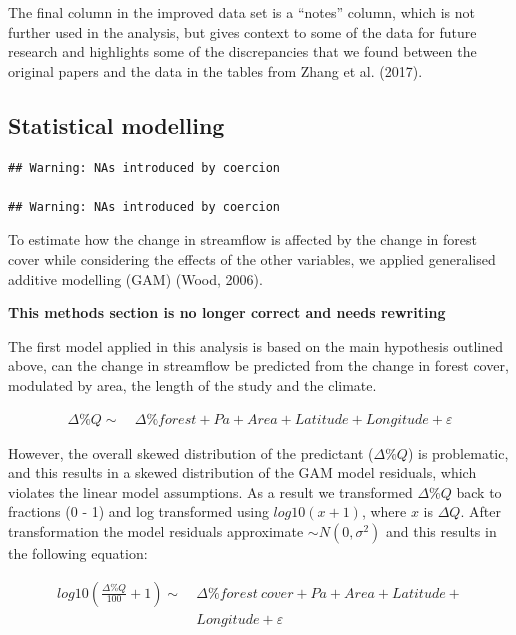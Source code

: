 \documentclass[]{elsarticle} %
\begin{document}
The final column in the improved data set is a ``notes'' column, which
is not further used in the analysis, but gives context to some of the
data for future research and highlights some of the discrepancies that
we found between the original papers and the data in the tables from
Zhang et al. (2017).

\hypertarget{statistical-modelling}{%
\subsection{Statistical modelling}\label{statistical-modelling}}

\begin{verbatim}
## Warning: NAs introduced by coercion

## Warning: NAs introduced by coercion
\end{verbatim}

To estimate how the change in streamflow is affected by the change in
forest cover while considering the effects of the other variables, we
applied generalised additive modelling (GAM) (Wood, 2006).

\textbf{This methods section is no longer correct and needs rewriting}

The first model applied in this analysis is based on the main hypothesis
outlined above, can the change in streamflow be predicted from the
change in forest cover, modulated by area, the length of the study and
the climate.

\[\tag{1}
\begin{aligned}
\Delta \%Q \sim ~&\Delta \%forest + Pa + Area + Latitude + Longitude + \varepsilon
\end{aligned}\]

However, the overall skewed distribution of the predictant
(\(\Delta \%Q\)) is problematic, and this results in a skewed
distribution of the GAM model residuals, which violates the linear model
assumptions. As a result we transformed \(\Delta \%Q\) back to fractions
(0 - 1) and log transformed using \(log10(x + 1)\), where \(x\) is
\(\Delta Q\). After transformation the model residuals approximate
\(\sim N(0,\sigma^2)\) and this results in the following equation:

\[\tag{2}
\begin{aligned}
log10(\frac{\Delta \% Q}{100} + 1) \sim ~ &\Delta \%{forest~cover}
+ Pa + Area + Latitude + 
\\ &Longitude + \varepsilon
\end{aligned}\]
\end{document}

